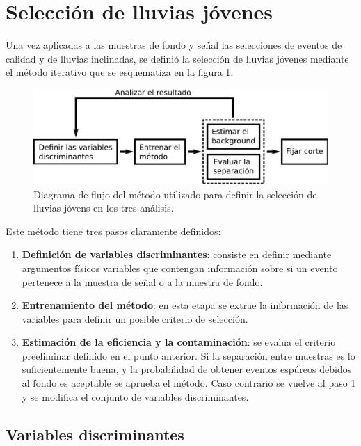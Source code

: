 \section{Selecci\'on de lluvias j\'ovenes}
\label{sc:selNu}
	
	Una vez aplicadas a las muestras de fondo y señal las selecciones de eventos de calidad y de lluvias inclinadas, se definió la selección de lluvias jóvenes mediante el método iterativo que se esquematiza en la figura \ref{fig:entrenamiento}.
	\begin{figure}[ht!]
		\begin{center}
		\includegraphics[width=1.0\textwidth]{fig/seleccionAuger/entrenamiento}
		\caption{Diagrama de flujo del método utilizado para definir la selección de lluvias jóvens en los tres análisis.}
		\label{fig:entrenamiento}
		\end{center}
	\end{figure}
	Este método tiene tres pasos claramente definidos:
	\begin{enumerate}
	 \item \textbf{Definición de variables discriminantes}: consiste en definir mediante argumentos físicos variables que contengan información sobre si un evento pertenece a la muestra de señal o a la muestra de fondo.
	 \item \textbf{Entrenamiento del método}: en esta etapa se extrae la información de las variables para definir un posible criterio de selección. 
	 \item \textbf{Estimación de la eficiencia y la contaminación}: se evalua el criterio preeliminar definido en el punto anterior. Si la separación entre muestras es lo suficientemente buena, y la probabilidad de obtener eventos espúreos debidos al fondo es aceptable se aprueba el método. Caso contrario se vuelve al paso 1 y se modifica el conjunto de variables discriminantes.
	\end{enumerate}
	\subsection{Variables discriminantes}
	\label{sbsc:discVars}
	
